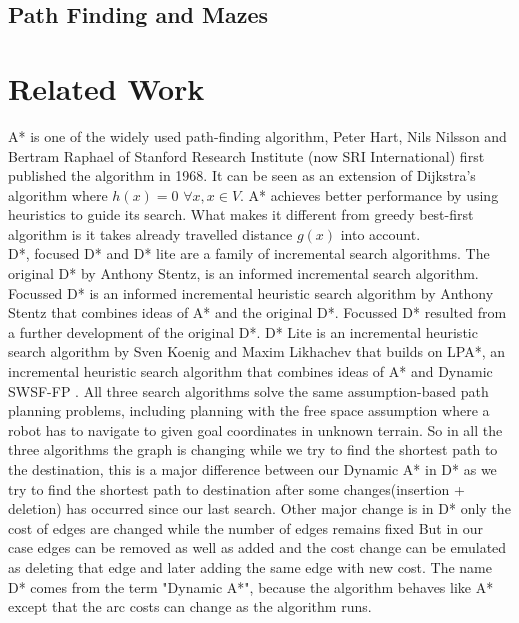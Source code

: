 \documentclass[a4paper]{article}
\begin{document}

\subsection{Path Finding and Mazes}


\section{Related Work}
A* \cite{A*} is one of the widely used path-finding algorithm, Peter Hart, Nils Nilsson and Bertram Raphael of Stanford Research Institute (now SRI International) first published the algorithm in 1968. It can be seen as an extension of Dijkstra's algorithm where $h(x)=0 $ $\forall x, x \in V$. A* achieves better performance by using heuristics to guide its search. What makes it different from greedy best-first algorithm is it takes already travelled distance $g(x)$ into account.\\
D*\cite{original D*}, focused D*\cite{focused D*} and D* lite\cite{D* Lite} are a family of incremental search algorithms. The original D*\cite{original D*} by Anthony Stentz, is an informed incremental search algorithm. Focussed D*\cite{focused D*} is an informed incremental heuristic search algorithm by Anthony Stentz that combines ideas of A*\cite{A*} and the original D*\cite{original D*}. Focussed D* resulted from a further development of the original D*. D* Lite \cite{D* Lite} is an incremental heuristic search algorithm by Sven Koenig and Maxim Likhachev that builds on LPA*\cite{LPA*}, an incremental heuristic search algorithm that combines ideas of A* and Dynamic SWSF-FP \cite{SPP}. All three search algorithms solve the same assumption-based path planning problems, including planning with the free space assumption\cite{PF} where a robot has to navigate to given goal coordinates in unknown terrain. So in all the three algorithms the graph is changing while we try to find the shortest path to the destination, this is a major difference between our Dynamic A* in D* as we try to find the shortest path to destination after some changes(insertion + deletion) has occurred since our last search. Other major change is in D* only the cost of edges are changed while the number of edges remains fixed But in our case edges can be removed as well as added and the cost change can be emulated as deleting that edge and later adding the same edge with new cost. The name D* comes from the term "Dynamic A*", because the algorithm behaves like A* except that the arc costs can change as the algorithm runs.\\
\end{document}
